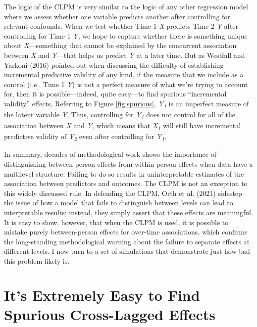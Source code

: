 \documentclass[
  english,
  man,floatsintext]{apa6}
\begin{document}
The logic of the CLPM is very similar to the logic of any other regression model where we assess whether one variable predicts another after controlling for relevant confounds. When we test whether Time 1 \emph{X} predicts Time 2 \emph{Y} after controlling for Time 1 \emph{Y}, we hope to capture whether there is something unique about \emph{X}---something that cannot be explained by the concurrent association between \emph{X} and \emph{Y}---that helps us predict \emph{Y} at a later time. But as Westfall and Yarkoni (2016) pointed out when discussing the difficulty of establishing incremental predictive validity of any kind, if the measure that we include as a control (i.e., Time 1 \emph{Y}) is not a perfect measure of what we're trying to account for, then it is possible---indeed, quite easy---to find spurious ``incremental validity'' effects. Referring to Figure \ref{fig:spurious}, \emph{Y\textsubscript{1}} is an imperfect measure of the latent variable \emph{Y}. Thus, controlling for \emph{Y\textsubscript{1}} does not control for all of the association between \emph{X} and \emph{Y}, which means that \emph{X\textsubscript{1}} will still have incremental predictive validity of \emph{Y\textsubscript{2}} even after controlling for \emph{Y\textsubscript{1}}.

In summary, decades of methodological work shows the importance of distinguishing between-person effects from within-person effects when data have a multilevel structure. Failing to do so results in uninterpretable estimates of the association between predictors and outcomes. The CLPM is not an exception to this widely discussed rule. In defending the CLPM, Orth et al. (2021) sidestep the issue of how a model that fails to distinguish between levels can lead to interpretable results; instead, they simply assert that these effects are meaningful. It is easy to show, however, that when the CLPM is used, it is possible to mistake purely between-person effects for over-time associations, which confirms the long-standing methodological warning about the failure to separate effects at different levels. I now turn to a set of simulations that demonstrate just how bad this problem likely is.

\hypertarget{its-extremely-easy-to-find-spurious-cross-lagged-effects}{%
\section{It's Extremely Easy to Find Spurious Cross-Lagged Effects}\label{its-extremely-easy-to-find-spurious-cross-lagged-effects}}
\end{document}
